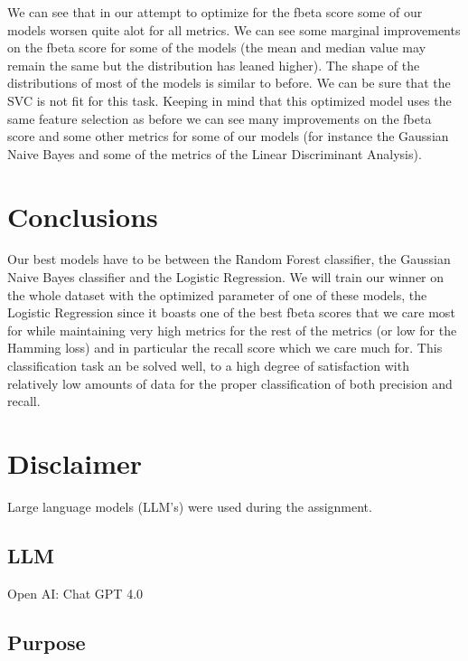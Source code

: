 \documentclass[12pt, a4paper]{article}
\begin{document}
\begin{multicols}{2}

    We can see that in our attempt to optimize for the fbeta score some of our models worsen quite alot for all metrics. We can see some marginal improvements on the fbeta score for some of the models (the mean and median value may remain the same but the distribution has leaned higher). The shape of the distributions of most of the models is similar to before. We can be sure that the SVC is not fit for this task. Keeping in mind that this optimized model uses the same feature selection as before we can see many improvements on the fbeta score and some other metrics for some of our models (for instance the Gaussian Naive Bayes and some of the metrics of the Linear Discriminant Analysis).
    \newline

    \section{Conclusions} \label{sec:conc}

    Our best models have to be between the Random Forest classifier, the Gaussian Naive Bayes classifier and the Logistic Regression. We will train our winner on the whole dataset with the optimized parameter of one of these models, the Logistic Regression since it boasts one of the best fbeta scores that we care most for while maintaining very high metrics for the rest of the metrics (or low for the Hamming loss) and in particular the recall score which we care much for. This classification task an be solved well, to a high degree of satisfaction with relatively low amounts of data for the proper classification of both precision and recall.
    \newline

    \section{Disclaimer} \label{sec:disc}

    Large language models (LLM's) were used during the assignment.

    \subsection{LLM} \label{subsec:llms}

    Open AI: Chat GPT 4.0 \cite{noauthor_chatgpt_nodate}

    \subsection{Purpose} \label{subsec:llmUse}


\end{multicols}
\end{document}
